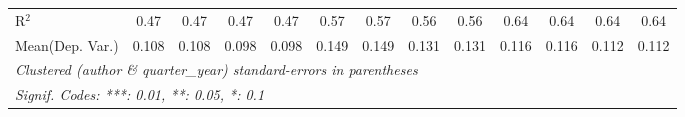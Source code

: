 \begin{tabular}{lcccccccccccc}
   R$^2$                                    & 0.47         & 0.47     & 0.47        & 0.47     & 0.57    & 0.57     & 0.56    & 0.56         & 0.64    & 0.64          & 0.64    & 0.64\\  
Mean(Dep. Var.) & 0.108 & 0.108 & 0.098 & 0.098 & 0.149 & 0.149 & 0.131 & 0.131 & 0.116 & 0.116 & 0.112 & 0.112 \\
   \midrule \midrule
   \multicolumn{13}{l}{\emph{Clustered (author \& quarter\_year) standard-errors in parentheses}}\\
   \multicolumn{13}{l}{\emph{Signif. Codes: ***: 0.01, **: 0.05, *: 0.1}}\\
\end{tabular}
\par\endgroup
